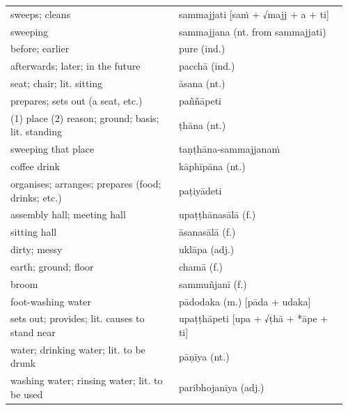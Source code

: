 \documentclass[11pt,oneside]{memoir}
\begin{document}
\clearpage

\begin{longtable}{L{0.48\linewidth} L{0.48\linewidth}}
sweeps; cleans & sammajjati [saṁ + √majj + a + ti]\\
sweeping & sammajjana (nt. from sammajjati)\\
before; earlier & pure (ind.)\\
afterwards; later; in the future & pacchā (ind.)\\
seat; chair; lit. sitting & āsana (nt.)\\
prepares; sets out (a seat, etc.) & paññāpeti\\
(1) place (2) reason; ground; basis;  lit. standing & ṭhāna (nt.)\\
sweeping that place & taṇṭhāna-sammajjanaṁ\\
coffee drink & kāphīpāna (nt.)\\
organises; arranges; prepares (food; drinks; etc.) & paṭiyādeti\\
assembly hall; meeting hall & upaṭṭhānasālā (f.)\\
sitting hall & āsanasālā (f.)\\
dirty; messy & uklāpa (adj.)\\
earth; ground; floor & chamā (f.)\\
broom & sammuñjanī (f.)\\
foot-washing water & pādodaka (m.) [pāda + udaka]\\
sets out; provides; lit. causes to stand near & upaṭṭhāpeti [upa + √ṭhā + *āpe + ti]\\
water; drinking water; lit. to be drunk & pāṇīya (nt.)\\
washing water; rinsing water; lit. to be used & paribhojanīya (adj.)\\
\end{longtable}

\renewcommand{\arraystretch}{1.8}
\end{document}
